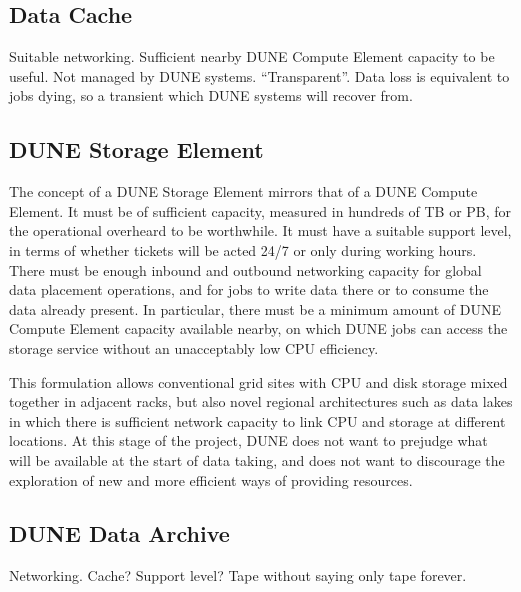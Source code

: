 \documentclass[../main-v1.tex]{subfiles}
\begin{document}
\subsection{Data Cache}
\label{sec:cm:data_cache}

Suitable networking. Sufficient nearby DUNE Compute Element capacity to be useful. Not managed by DUNE systems. ``Transparent''. Data loss is equivalent to jobs dying, so a transient which DUNE systems will recover from.

\subsection{DUNE Storage Element}
\label{sec:cm:dse}

The concept of a DUNE Storage Element mirrors that of a DUNE Compute Element. It must be of sufficient capacity, measured in hundreds of TB or PB, for the operational overheard to be worthwhile. It must have a suitable support level, in terms of whether tickets will be acted 24/7 or only during working hours. There must be enough inbound and outbound networking capacity for global data placement operations, and for jobs to write data there or to consume the data already present. In particular, there must be a minimum amount of DUNE Compute Element capacity available nearby, on which DUNE jobs can access the storage service without an unacceptably low CPU efficiency. 

This formulation allows conventional grid sites with CPU and disk storage mixed together in adjacent racks, but also novel regional architectures such as data lakes in which there is sufficient network capacity to link CPU and storage at different locations. At this stage of the project, DUNE does not want to prejudge what will be available at the start of data taking, and does not want to discourage the exploration of new and more efficient ways of providing resources.

\subsection{DUNE Data Archive}

Networking. Cache? Support level? Tape without saying only tape forever.
\end{document}
